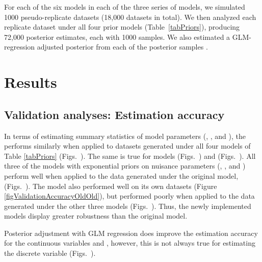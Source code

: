 \documentclass[letterpaper,12pt]{article}
\begin{document}
\begin{linenumbers}
For each of the six models in each of the three series of models, we simulated
1000 pseudo-replicate datasets (18,000 datasets in total).
We then analyzed each replicate dataset under all four prior models
(Table~\ref{tabPriors}), producing 72,000 posterior estimates, each with 1000
samples.
We also estimated a GLM-regression adjusted posterior from each of the
posterior samples \citep{Leuenberger2010}.

\section*{Results}
\subsection*{Validation analyses: Estimation accuracy}
In terms of estimating summary statistics of model parameters (\divTimeNum,
\divTimeDispersion, and \divTimeMean), the \modelDPP performs similarly when
applied to datasets generated under all four models of Table \ref{tabPriors}
(Figs.\
).
The same is true for models \modelUniform (Figs.\
)
and \modelUshaped (Figs.\
).
All three of the models with exponential priors on nuisance parameters
(\modelDPP, \modelUniform, and \modelUshaped) perform well when applied
to the data generated under the original \msb model, \modelOld (Figs.\
).
The \modelOld model also performed well on its own datasets (Figure
\ref{figValidationAccuracyOldOld}), but performed poorly when applied to the
data generated under the other three models (Figs.\
).
Thus, the newly implemented models display greater robustness than
the original model.

Posterior adjustment with GLM regression does improve the estimation
accuracy for the continuous variables \divTimeDispersion and \divTimeMean,
however, this is not always true for estimating the discrete variable
\divTimeNum (Figs.\
).


\end{linenumbers}
\end{document}
